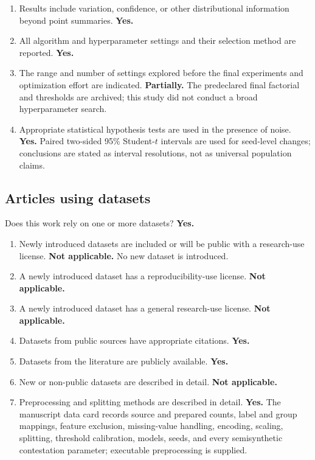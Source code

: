 \begin{enumerate}
    omitted. \textbf{Yes.}
  \item Results include variation, confidence, or other distributional
    information beyond point summaries. \textbf{Yes.}
  \item All algorithm and hyperparameter settings and their selection method
    are reported. \textbf{Yes.}
  \item The range and number of settings explored before the final experiments
    and optimization effort are indicated. \textbf{Partially.} The
    predeclared final factorial and thresholds are archived; this study did not
    conduct a broad hyperparameter search.
  \item Appropriate statistical hypothesis tests are used in the presence of
    noise. \textbf{Yes.} Paired two-sided 95\% Student-$t$ intervals are used
    for seed-level changes; conclusions are stated as interval resolutions,
    not as universal population claims.
\end{enumerate}

\subsection*{Articles using datasets}

Does this work rely on one or more datasets? \textbf{Yes.}

\begin{enumerate}
  \item Newly introduced datasets are included or will be public with a
    research-use license. \textbf{Not applicable.} No new dataset is
    introduced.
  \item A newly introduced dataset has a reproducibility-use license.
    \textbf{Not applicable.}
  \item A newly introduced dataset has a general research-use license.
    \textbf{Not applicable.}
  \item Datasets from public sources have appropriate citations.
    \textbf{Yes.}
  \item Datasets from the literature are publicly available.
    \textbf{Yes.}
  \item New or non-public datasets are described in detail.
    \textbf{Not applicable.}
  \item Preprocessing and splitting methods are described in detail.
    \textbf{Yes.} The manuscript data card records source and prepared counts,
    label and group mappings, feature exclusion, missing-value handling,
    encoding, scaling, splitting, threshold calibration, models, seeds, and
    every semisynthetic contestation parameter; executable preprocessing is
    supplied.
\end{enumerate}
